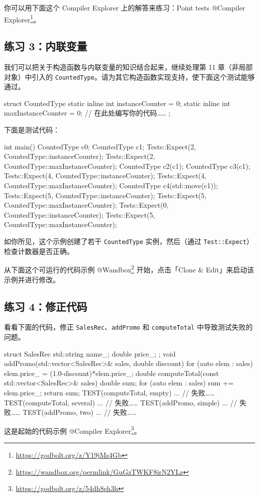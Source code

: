 你可以用下面这个 Compiler Explorer 上的解答来练习：Point tests @Compiler Explorer\footnote{\url{https://godbolt.org/z/Y19jMs4Gb}}。

\subsection{练习 3：内联变量}

我们可以把关于构造函数与内联变量的知识结合起来，继续处理第 11 章（非局部对象）中引入的 \texttt{CountedType}。请为其它构造函数实现支持，使下面这个测试能够通过。

\begin{codebox}[cpp]
struct CountedType {
static inline int instanceCounter = 0;
static inline int maxInstanceCounter = 0;
// 在此处编写你的代码……
};
\end{codebox}

下面是测试代码：

\begin{codebox}[cpp]
int main() {
{
CountedType c0;
CountedType c1;
Tests::Expect(2, CountedType::instanceCounter);
Tests::Expect(2, CountedType::maxInstanceCounter);
CountedType c2(c1);
CountedType c3(c1);
Tests::Expect(4, CountedType::instanceCounter);
Tests::Expect(4, CountedType::maxInstanceCounter);
CountedType c4(std::move(c1));
Tests::Expect(5, CountedType::instanceCounter);
Tests::Expect(5, CountedType::maxInstanceCounter);
}
Tests::Expect(0, CountedType::instanceCounter);
Tests::Expect(5, CountedType::maxInstanceCounter);
}
\end{codebox}

如你所见，这个示例创建了若干 \texttt{CountedType} 实例，然后（通过 \texttt{Test::Expect}）检查计数器是否正确。

从下面这个可运行的代码示例 @Wandbox\footnote{\url{https://wandbox.org/permlink/GuGzTWKF8irN2YLz}} 开始，点击「Clone \& Edit」来启动该示例并进行修改。


\subsection{练习 4：修正代码}

看看下面的代码，修正 \texttt{SalesRec}、\texttt{addPromo} 和 \texttt{computeTotal} 中导致测试失败的问题。

\begin{codebox}[cpp]
struct SalesRec { std::string name_;
double price_; };
void addPromo(std::vector<SalesRec>& sales, double discount) {
for (auto elem : sales)
elem.price_ = (1.0-discount)*elem.price_;
}
double computeTotal(const std::vector<SalesRec>& sales) {
double sum;
for (auto elem : sales)
sum += elem.price_;
return sum;
}
TEST(computeTotal, empty) { ... }
// 失败……
TEST(computeTotal, several) { ... } // 失败……
TEST(addPromo, simple) { ... }
// 失败……
TEST(addPromo, two) { ... }
// 失败……
\end{codebox}

这是起始的代码示例 @Compiler Explorer\footnote{\url{https://godbolt.org/z/54dh8eh3h}}。
